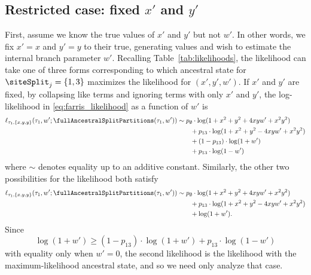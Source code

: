 \subsection{Restricted case: fixed $x'$ and $y'$}
\label{sec:restricted-case}

First, assume we know the true values of $x'$ and $y'$ but not $w'$.
In other words, we fix $x'=x$ and $y'=y$ to their true, generating values and wish to estimate the internal branch parameter $w'$.
Recalling Table~\ref{tab:likelihoods}, the likelihood can take one of three forms corresponding to which ancestral state for $\siteSplit_j=\{1,3\}$ maximizes the likelihood for $(x',y',w')$.
If $x'$ and $y'$ are fixed, by collapsing like terms and ignoring terms with only $x'$ and $y'$, the log-likelihood in \eqref{eq:farris_likelihood} as a function of $w'$ is
\begin{align*}
    \ell_{\tau_1,\{x,y,y\}}(\tau_1, w'; \fullAncestralSplitPartitions(\tau_1,w'))
    &\sim     p_{\emptyset}  \cdot\log(1+x^2+y^2+4xyw'+x^2y^2) \\
    &\qquad + p_{13}         \cdot\log(1+x^2+y^2-4xyw'+x^2y^2) \\
    &\qquad + (1 - p_{13})\cdot\log(1+w') \\
    &\qquad + p_{13}\cdot\log(1-w')
\end{align*}
where $\sim$ denotes equality up to an additive constant.
Similarly, the other two possibilities for the likelihood both satisfy
\begin{align*}
    \ell_{\tau_1,\{x,y,y\}}(\tau_1, w'; \fullAncestralSplitPartitions(\tau_1,w'))
    &\sim     p_{\emptyset}  \cdot\log(1+x^2+y^2+4xyw'+x^2y^2) \\
    &\qquad + p_{13}         \cdot\log(1+x^2+y^2-4xyw'+x^2y^2) \\
    &\qquad + \log(1+w').
\end{align*}
Since
$$
\log(1+w') \geq (1 - p_{13})\cdot\log(1+w') + p_{13}\cdot\log(1-w')
$$
with equality only when $w'=0$, the second likelihood is the likelihood with the maximum-likelihood ancestral state, and so we need only analyze that case.

